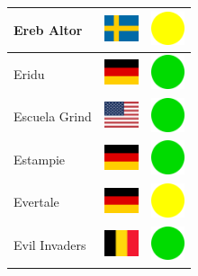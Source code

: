 \documentclass[12pt, a4paper, twoside]{report}
\begin{document}
\begin{center}
\begin{longtable}{|p{5cm}|p{2cm}|p{2cm}|}
Ereb Altor & \includegraphics[width=1cm]{4x3/se} & \includegraphics[width=1cm]{likes/m} \\ \hline
Eridu & \includegraphics[width=1cm]{4x3/de} & \includegraphics[width=1cm]{likes/y} \\ \hline
Escuela Grind & \includegraphics[width=1cm]{4x3/us} & \includegraphics[width=1cm]{likes/y} \\ \hline
Estampie & \includegraphics[width=1cm]{4x3/de} & \includegraphics[width=1cm]{likes/y} \\ \hline
Evertale & \includegraphics[width=1cm]{4x3/de} & \includegraphics[width=1cm]{likes/m} \\ \hline
Evil Invaders & \includegraphics[width=1cm]{4x3/be} & \includegraphics[width=1cm]{likes/y} \\ \hline

\end{longtable}
\end{center}
\end{document}
